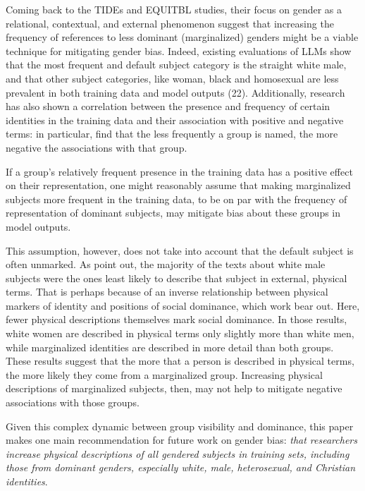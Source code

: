 \documentclass[anonymous,review]{acmart}
\begin{document}
Coming back to the TIDEs and EQUITBL studies, their focus on gender as a relational, contextual, and external phenomenon suggest that increasing the frequency of references to less dominant (marginalized) genders might be a viable technique for mitigating gender bias. Indeed, existing evaluations of LLMs show that the most frequent and default subject category is the straight white male, and that other subject categories, like woman, black and homosexual are less prevalent in both training data and model outputs (22). Additionally, research has also shown a correlation between the presence and frequency of certain identities in the training data and their association with positive and negative terms: \citet{loon:2022} in particular, find that the less frequently a group is named, the more negative the associations with that group. 

If a group’s relatively frequent presence in the training data has a positive effect on their representation, one might reasonably assume that making marginalized subjects more frequent in the training data, to be on par with the frequency of representation of dominant subjects, may mitigate bias about these groups in model outputs. 

This assumption, however, does not take into account that the default subject is often unmarked. As \citet{devinney:2024} point out, the majority of the texts about white male subjects were the ones least likely to describe that subject in external, physical terms. That is perhaps because of an inverse relationship between physical markers of identity and positions of social dominance, which \citet{devinney:2024} work bear out. Here, fewer physical descriptions themselves mark social dominance. In those results, white women are described in physical terms only slightly more than white men, while marginalized identities are described in more detail than both groups. These results suggest that the more that a person is described in physical terms, the more likely they come from a marginalized group. Increasing physical descriptions of marginalized subjects, then, may not help to mitigate negative associations with those groups. 

Given this complex dynamic between group visibility and dominance, this paper makes one main recommendation for future work on gender bias: \textit{that researchers increase physical descriptions of all gendered subjects in training sets, including those from dominant genders, especially white, male, heterosexual, and Christian identities}. 
\end{document}
